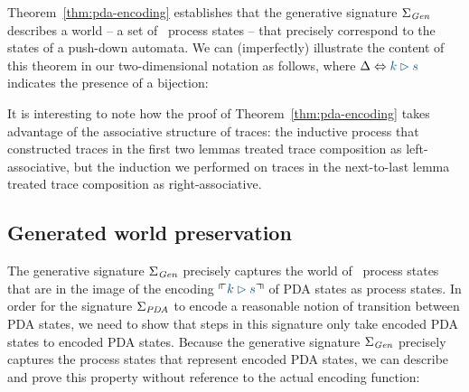 Theorem~\ref{thm:pda-encoding} establishes that the generative
signature $\Sigma_{\it Gen}$ describes a world -- a set of
\sls~process states -- that precisely correspond to the states of a
push-down automata.  We can (imperfectly) illustrate the content of
this theorem in our two-dimensional notation as follows, where 
$\Delta \Leftrightarrow \obj{k \rhd s}$ indicates the presence of a
bijection:
\begin{center}
\end{center}

It is interesting to note how the proof of
Theorem~\ref{thm:pda-encoding} takes advantage of the associative
structure of traces: the inductive process that constructed traces in
the first two lemmas treated trace composition as left-associative,
but the induction we performed on traces in the next-to-last lemma
treated trace composition as right-associative.

\subsection{Generated world preservation}

The generative signature $\Sigma_{\it Gen}$ precisely captures the
world of \sls~process states that are in the image of the encoding
$\ctxinterp{k \rhd s}$ of PDA states as process states. In order for
the signature $\Sigma_{\it PDA}$ to encode a reasonable notion of
transition between PDA states, we need to show that steps in this
signature only take encoded PDA states to encoded PDA states. Because 
the generative signature $\Sigma_{\it Gen}$ precisely captures the 
process states that represent encoded PDA states, we can describe
and prove this property without reference to the actual encoding function:
 
